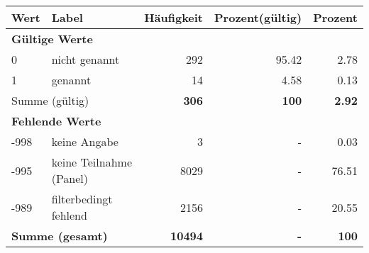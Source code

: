      \begin{longtable}{lXrrr}
     \toprule
     \textbf{Wert} & \textbf{Label} & \textbf{Häufigkeit} & \textbf{Prozent(gültig)} & \textbf{Prozent} \\
     \endhead
     \midrule
     \multicolumn{5}{l}{\textbf{Gültige Werte}}\\

     0 &
     \multicolumn{1}{X}{ nicht genannt   } &


       \num{292} &
       \num[round-mode=places,round-precision=2]{95.42} &
         \num[round-mode=places,round-precision=2]{2.78} \\

     1 &
     \multicolumn{1}{X}{ genannt   } &


       \num{14} &
       \num[round-mode=places,round-precision=2]{4.58} &
         \num[round-mode=places,round-precision=2]{0.13} \\
     \midrule
     \multicolumn{2}{l}{Summe (gültig)} &
       \textbf{\num{306}} &
     \textbf{\num{100}} &
       \textbf{\num[round-mode=places,round-precision=2]{2.92}} \\
     \multicolumn{5}{l}{\textbf{Fehlende Werte}}\\
       -998 &
       keine Angabe &
         \num{3} &
        - &
         \num[round-mode=places,round-precision=2]{0.03} \\
       -995 &
       keine Teilnahme (Panel) &
         \num{8029} &
        - &
         \num[round-mode=places,round-precision=2]{76.51} \\
       -989 &
       filterbedingt fehlend &
         \num{2156} &
        - &
         \num[round-mode=places,round-precision=2]{20.55} \\
     \midrule
     \multicolumn{2}{l}{\textbf{Summe (gesamt)}} &
          \textbf{\num{10494}} &
        \textbf{-} &
        \textbf{\num{100}} \\
     \bottomrule
     \end{longtable}
     
